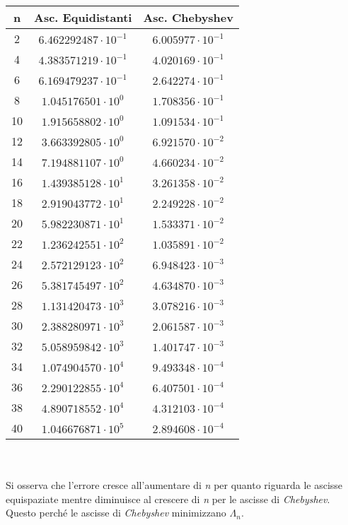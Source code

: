 \documentclass[a4paper]{report}
\begin{document}
\begin{tabular}{|c|c|c|}	%
\hline
n&Asc. Equidistanti&Asc. Chebyshev\\\hline
2 &$6.462292487 \cdot 10^{-1}$&$6.005977 \cdot 10^{-1}$\\ \hline
4 &$4.383571219 \cdot 10^{-1}$&$4.020169 \cdot 10^{-1}$\\ \hline
6 &$6.169479237 \cdot 10^{-1}$&$2.642274 \cdot 10^{-1}$\\ \hline
8 &$1.045176501 \cdot 10^{0}$ &$1.708356 \cdot 10^{-1}$\\ \hline
10&$1.915658802 \cdot 10^{0}$ &$1.091534 \cdot 10^{-1}$\\ \hline
12&$3.663392805 \cdot 10^{0}$ &$6.921570 \cdot 10^{-2}$\\ \hline
14&$7.194881107 \cdot 10^{0}$ &$4.660234 \cdot 10^{-2}$\\ \hline
16&$1.439385128 \cdot 10^{1}$ &$3.261358 \cdot 10^{-2}$\\ \hline
18&$2.919043772 \cdot 10^{1}$ &$2.249228 \cdot 10^{-2}$\\ \hline
20&$5.982230871 \cdot 10^{1}$ &$1.533371 \cdot 10^{-2}$\\ \hline
22&$1.236242551 \cdot 10^{2}$ &$1.035891 \cdot 10^{-2}$\\ \hline
24&$2.572129123 \cdot 10^{2}$ &$6.948423 \cdot 10^{-3}$\\ \hline
26&$5.381745497 \cdot 10^{2}$ &$4.634870 \cdot 10^{-3}$\\ \hline
28&$1.131420473 \cdot 10^{3}$ &$3.078216 \cdot 10^{-3}$\\ \hline
30&$2.388280971 \cdot 10^{3}$ &$2.061587 \cdot 10^{-3}$\\ \hline
32&$5.058959842 \cdot 10^{3}$ &$1.401747 \cdot 10^{-3}$\\ \hline
34&$1.074904570 \cdot 10^{4}$ &$9.493348 \cdot 10^{-4}$\\ \hline
36&$2.290122855 \cdot 10^{4}$ &$6.407501 \cdot 10^{-4}$\\ \hline
38&$4.890718552 \cdot 10^{4}$ &$4.312103 \cdot 10^{-4}$\\ \hline
40&$1.046676871 \cdot 10^{5}$ &$2.894608 \cdot 10^{-4}$\\ \hline
\end{tabular}
\\ \\ Si osserva che l'errore cresce all'aumentare di \emph{n} per quanto riguarda le ascisse equispaziate mentre diminuisce al crescere di \emph{n} per le ascisse di \emph{Chebyshev}. Questo perché le ascisse di \emph{Chebyshev} minimizzano $\Lambda_n$.
\newpage
\end{document}
